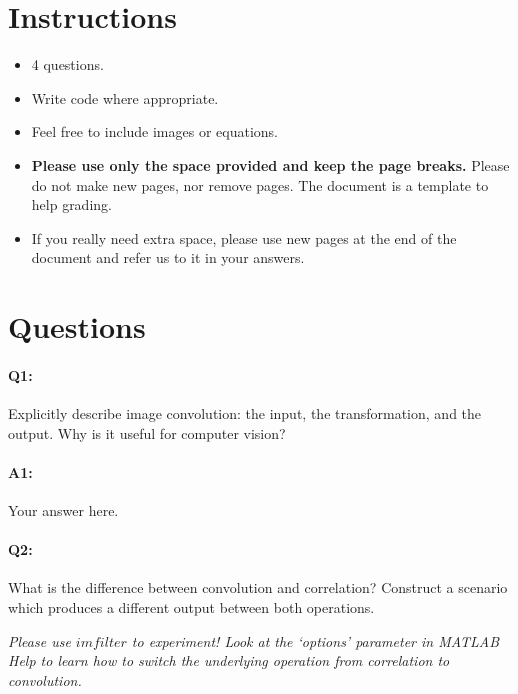 \section*{Instructions}
\begin{itemize}
  \item 4 questions.
  \item Write code where appropriate.
  \item Feel free to include images or equations.%
  \item \textbf{Please use only the space provided and keep the page breaks.} Please do not make new pages, nor remove pages. The document is a template to help grading.
  \item If you really need extra space, please use new pages at the end of the document and refer us to it in your answers.
\end{itemize}

\section*{Questions}

\paragraph{Q1:} Explicitly describe image convolution: the input, the transformation, and the output. Why is it useful for computer vision?

\paragraph{A1:} Your answer here.




\pagebreak
\paragraph{Q2:} What is the difference between convolution and correlation? Construct a scenario which produces a different output between both operations.

\emph{Please use \href{https://www.mathworks.com/help/images/ref/imfilter.html}{$imfilter$} to experiment! Look at the `options' parameter in MATLAB Help to learn how to switch the underlying operation from correlation to convolution.}


